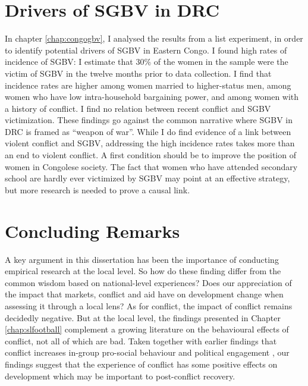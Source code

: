 \section{Drivers of SGBV in DRC}
In chapter \ref{chap:congogbv}, I analysed the results from a list experiment, in order to identify potential drivers of SGBV in Eastern Congo. I found high rates of incidence of SGBV: I estimate that 30\% of the women in the sample were the victim of SGBV in the twelve months prior to data collection. I find that incidence rates are higher among women married to higher-status men, among women who have low intra-household bargaining power, and among women with a history of conflict. I find no relation between recent conflict and SGBV victimization. These findings go against the common narrative where SGBV in DRC is framed as ``weapon of war''. While I do find evidence of a link between violent conflict and SGBV, addressing the high incidence rates takes more than an end to violent conflict. A first condition should be to improve the position of women in Congolese society. The fact that women who have attended secondary school are hardly ever victimized by SGBV may point at an effective strategy, but more research is needed to prove a causal link.

\section{Concluding Remarks}
A key argument in this dissertation has been the importance of conducting empirical research at the local level. So how do these finding differ from the common wisdom based on national-level experiences? Does our appreciation of the impact that markets, conflict and aid have on development change when assessing it through a local lens? As for conflict, the impact of conflict remains decidedly negative. But at the local level, the findings presented in Chapter \ref{chap:slfootball} complement a growing literature on the behavioural effects of conflict, not all of which are bad. Taken together with earlier findings that conflict increases in-group pro-social behaviour \cite{Bellows2009b,Voors2012,Gilligan2014,Bauer2014} and political engagement \cite{Bellows2009b,Blattman2009a}, our findings suggest that the experience of conflict has some positive effects on development which may be important to post-conflict recovery.

